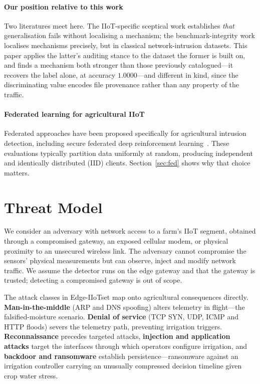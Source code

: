 \paragraph{Our position relative to this work} Two literatures meet here. The
IIoT-specific sceptical work establishes \emph{that} generalisation fails
without localising a mechanism; the benchmark-integrity work localises
mechanisms precisely, but in classical network-intrusion datasets. This paper
applies the latter's auditing stance to the dataset the former is built on, and
finds a mechanism both stronger than those previously catalogued---it recovers
the label alone, at accuracy $1.0000$---and different in kind, since the
discriminating value encodes file provenance rather than any property of the
traffic.

\paragraph{Federated learning for agricultural IIoT} Federated approaches have
been proposed specifically for agricultural intrusion detection, including
secure federated deep reinforcement learning~\cite{cluster2025sfedrl}. These
evaluations typically partition data uniformly at random, producing independent
and identically distributed (IID) clients. Section~\ref{sec:fed} shows why that
choice matters.

\section{Threat Model}

We consider an adversary with network access to a farm's IIoT segment, obtained
through a compromised gateway, an exposed cellular modem, or physical proximity
to an unsecured wireless link. The adversary cannot compromise the sensors'
physical measurements but can observe, inject and modify network traffic. We
assume the detector runs on the edge gateway and that the gateway is trusted;
detecting a compromised gateway is out of scope.

The attack classes in Edge-IIoTset map onto agricultural consequences directly.
\textbf{Man-in-the-middle} (ARP and DNS spoofing) alters telemetry in
flight---the falsified-moisture scenario. \textbf{Denial of service} (TCP SYN,
UDP, ICMP and HTTP floods) severs the telemetry path, preventing irrigation
triggers. \textbf{Reconnaissance} precedes targeted attacks, \textbf{injection
and application attacks} target the interfaces through which operators
configure irrigation, and \textbf{backdoor and ransomware} establish
persistence---ransomware against an irrigation controller carrying an unusually
compressed decision timeline given crop water stress.

